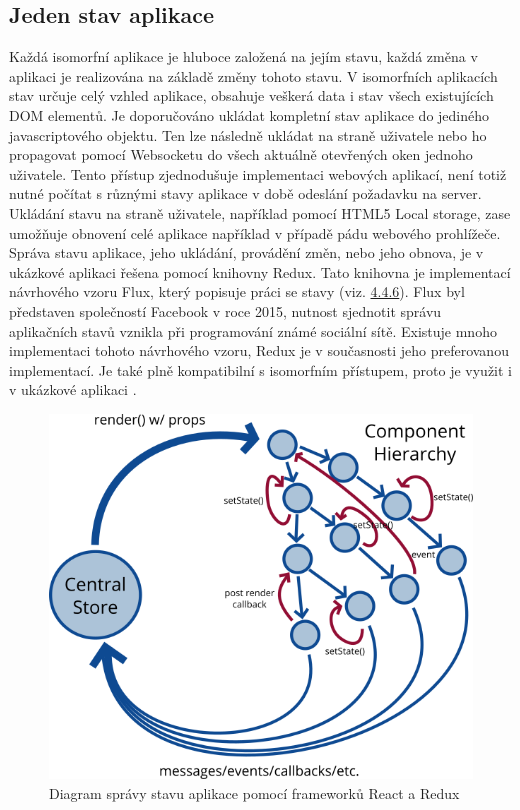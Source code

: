\subsection{Jeden stav aplikace}
Každá isomorfní aplikace je hluboce založená na jejím stavu, každá změna v aplikaci je realizována na základě změny tohoto stavu. V isomorfních aplikacích stav určuje celý vzhled aplikace, obsahuje veškerá data i stav všech existujících DOM elementů. Je doporučováno ukládat kompletní stav aplikace do jediného javascriptového objektu. Ten lze následně ukládat na straně uživatele nebo ho propagovat pomocí Websocketu do všech aktuálně otevřených oken jednoho uživatele. Tento přístup zjednodušuje implementaci webových aplikací, není totiž nutné počítat s různými stavy aplikace v době odeslání požadavku na server. Ukládání stavu na straně uživatele, například pomocí HTML5 Local storage, zase umožňuje obnovení celé aplikace například v případě pádu webového prohlížeče. Správa stavu aplikace, jeho ukládání, provádění změn, nebo jeho obnova, je v ukázkové aplikaci řešena pomocí knihovny Redux. Tato knihovna je implementací návrhového vzoru Flux, který popisuje práci se stavy (viz. \hyperref[sec:flux]{4.4.6}). Flux byl představen společností Facebook v roce 2015, nutnost sjednotit správu aplikačních stavů vznikla při programování známé sociální sítě. Existuje mnoho implementaci tohoto návrhového vzoru, Redux je v současnosti jeho preferovanou implementací. Je také plně kompatibilní s isomorfním přístupem, proto je využit i v ukázkové aplikaci \cite{redux}. 

\vspace{3mm}
\begin{figure}[h]
\begin{centering}
\includegraphics[scale=0.5]{obrazky/central_store}
\par\end{centering}
\caption{Diagram správy stavu aplikace pomocí frameworků React a Redux \cite{react_best_practices}} \label{fig:central_store}
\end{figure}
\FloatBarrier

